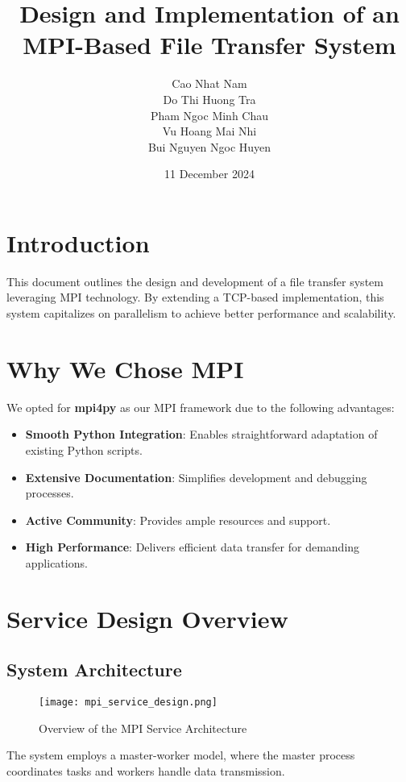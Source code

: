 \documentclass{article}
\title{Design and Implementation of an MPI-Based File Transfer System}
\author{
    Cao Nhat Nam \\
    Do Thi Huong Tra \\
    Pham Ngoc Minh Chau \\
    Vu Hoang Mai Nhi \\
    Bui Nguyen Ngoc Huyen
}
\date{11 December 2024}
\begin{document}
\maketitle

\section{Introduction}

This document outlines the design and development of a file transfer system leveraging MPI technology. By extending a TCP-based implementation, this system capitalizes on parallelism to achieve better performance and scalability.

\section{Why We Chose MPI}

We opted for \textbf{mpi4py} as our MPI framework due to the following advantages:
\begin{itemize}
    \item \textbf{Smooth Python Integration}: Enables straightforward adaptation of existing Python scripts.
    \item \textbf{Extensive Documentation}: Simplifies development and debugging processes.
    \item \textbf{Active Community}: Provides ample resources and support.
    \item \textbf{High Performance}: Delivers efficient data transfer for demanding applications.
\end{itemize}

\section{Service Design Overview}

\subsection{System Architecture}

\begin{figure}[h!]
    \centering
    \texttt{[image: mpi\_service\_design.png]}
    \caption{Overview of the MPI Service Architecture}
    \label{fig:mpi_service_design}
\end{figure}

The system employs a master-worker model, where the master process coordinates tasks and workers handle data transmission.
\end{document}
